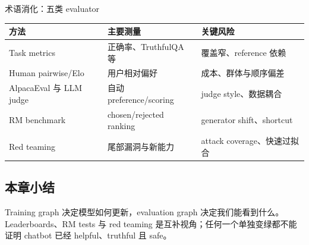 \begin{knowledgebox}{术语消化：五类 evaluator}
\begin{tabularx}{\textwidth}{@{}L{0.17\textwidth}L{0.24\textwidth}X@{}}
\toprule
方法 & 主要测量 & 关键风险 \\
\midrule
Task metrics & 正确率、TruthfulQA 等 & 覆盖窄、reference 依赖 \\
Human pairwise/Elo & 用户相对偏好 & 成本、群体与顺序偏差 \\
AlpacaEval 与 LLM judge & 自动 preference/scoring & judge style、数据耦合 \\
RM benchmark & chosen/rejected ranking & generator shift、shortcut \\
Red teaming & 尾部漏洞与新能力 & attack coverage、快速过拟合 \\
\bottomrule
\end{tabularx}
\end{knowledgebox}

\subsection{本章小结}

Training graph 决定模型如何更新，evaluation graph 决定我们能看到什么。Leaderboards、RM tests 与 red teaming 是互补视角；任何一个单独变绿都不能证明 chatbot 已经 helpful、truthful 且 safe。

